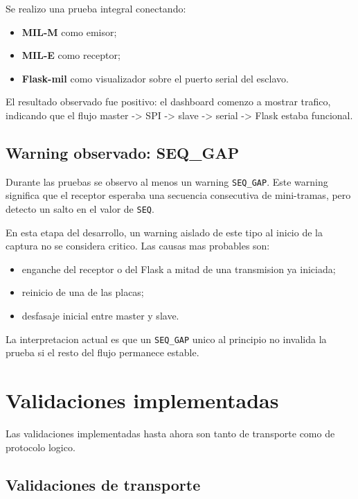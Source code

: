 \documentclass[12pt,a4paper]{article}
\begin{document}
Se realizo una prueba integral conectando:

\begin{itemize}
    \item \textbf{MIL-M} como emisor;
    \item \textbf{MIL-E} como receptor;
    \item \textbf{Flask-mil} como visualizador sobre el puerto serial del esclavo.
\end{itemize}

El resultado observado fue positivo: el dashboard comenzo a mostrar trafico, indicando que el flujo
master -> SPI -> slave -> serial -> Flask estaba funcional.

\subsection{Warning observado: SEQ\_GAP}

Durante las pruebas se observo al menos un warning \texttt{SEQ\_GAP}. Este warning significa que
el receptor esperaba una secuencia consecutiva de mini-tramas, pero detecto un salto en el valor
de \texttt{SEQ}.

En esta etapa del desarrollo, un warning aislado de este tipo al inicio de la captura no se considera
critico. Las causas mas probables son:

\begin{itemize}
    \item enganche del receptor o del Flask a mitad de una transmision ya iniciada;
    \item reinicio de una de las placas;
    \item desfasaje inicial entre master y slave.
\end{itemize}

La interpretacion actual es que un \texttt{SEQ\_GAP} unico al principio no invalida la prueba si el
resto del flujo permanece estable.

\section{Validaciones implementadas}

Las validaciones implementadas hasta ahora son tanto de transporte como de protocolo logico.

\subsection{Validaciones de transporte}
\end{document}
